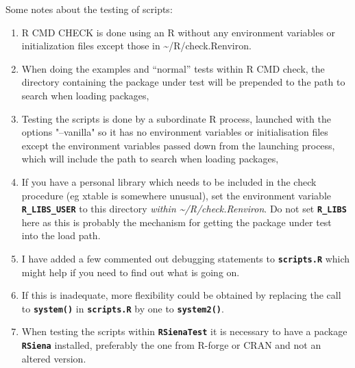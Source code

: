 \documentclass[12pt, a4paper]{article}
\renewcommand{\=}{\,=\,}
\newcommand{\+}{\,+\,}
\newcommand{\sfn}[1]{\textbf{\texttt{#1}}}
\begin{document}
\begin{description}
Some notes about the testing of scripts:
\begin{enumerate}
\item R CMD CHECK is done using an R without any
  environment variables or initialization files except those in
  \textasciitilde/R/check.Renviron.
\item When doing the examples and ``normal'' tests within R CMD check, the
  directory containing the package under test will be prepended to the path to
  search when loading packages,
\item Testing the scripts is done by a subordinate R process, launched with the
  options "--vanilla" so it has no environment variables or initialisation
  files except the environment variables passed down from the launching process,
  which will include the path to search when loading packages,
\item If you have a personal library which needs to be included in the check
  procedure (eg xtable is somewhere unusual), set the environment variable
  \sfn{R\_LIBS\_USER} to this directory \emph{within
    \textasciitilde/R/check.Renviron}. Do not set \sfn{R\_LIBS} here as this is
  probably the mechanism for getting the package under test into the load path.
\item I have added a few commented out debugging statements to \sfn{scripts.R}
  which might help if you need to find out what is going on.
\item If this is inadequate, more flexibility could be obtained by replacing
 the call to \sfn{system()} in \sfn{scripts.R} by one to \sfn{system2()}.
\item When testing the scripts within \sfn{RSienaTest} it is necessary to have a
  package \sfn{RSiena} installed, preferably the one from R-forge or CRAN and
  not an altered version.
\end{enumerate}



\end{description}
\end{document}
